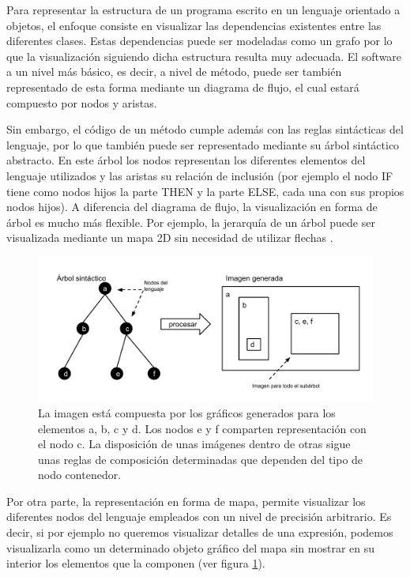\documentclass{llncs}
\begin{document}
Para representar la estructura de un programa escrito en un lenguaje orientado a objetos, el enfoque consiste en visualizar las dependencias existentes entre las diferentes clases. Estas dependencias puede ser modeladas como un grafo por lo que la visualización siguiendo dicha estructura resulta muy adecuada. El software a un nivel más básico, es decir, a nivel de método, puede ser también representado de esta forma mediante un diagrama de flujo, el cual estará compuesto por nodos y aristas.

Sin embargo, el código de un método cumple además con las reglas sintácticas del lenguaje, por lo que también puede ser representado mediante su árbol sintáctico abstracto. En este árbol los nodos representan los diferentes elementos del lenguaje utilizados y las aristas su relación de inclusión (por ejemplo el nodo IF tiene como nodos hijos la parte THEN y la parte ELSE, cada una con sus propios nodos hijos). A diferencia del diagrama de flujo, la visualización en forma de árbol es mucho más flexible. Por ejemplo, la jerarquía de un árbol puede ser visualizada mediante un mapa 2D sin necesidad de utilizar flechas \cite{softwarevisualization}.


\begin{figure}[ht]
\begin{center}
\includegraphics[scale=0.5]{images/arbol-mapa.pdf}
\caption{La imagen está compuesta por los gráficos generados para los elementos a, b, c y d. Los nodos e y f comparten representación con el nodo c. La disposición de unas imágenes dentro de otras sigue unas reglas de composición determinadas que dependen del tipo de nodo contenedor.
\label{fig:arbolmapa}}
\end{center}
\end{figure}

Por otra parte, la representación en forma de mapa, permite visualizar los diferentes nodos del lenguaje empleados con un nivel de precisión arbitrario. Es decir, si por ejemplo no queremos visualizar detalles de una expresión, podemos visualizarla como un determinado objeto gráfico del mapa sin mostrar en su interior los elementos que la componen (ver figura \ref{fig:arbolmapa}).
\end{document}
